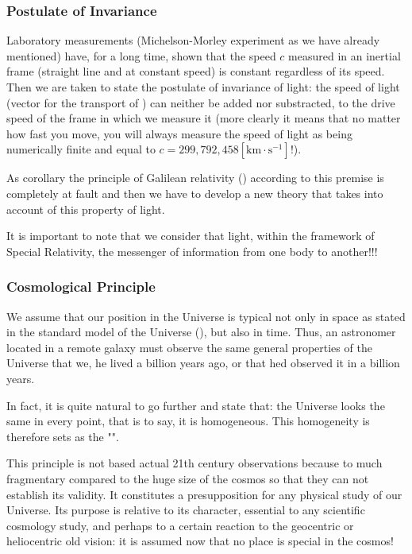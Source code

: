 	\subsubsection{Postulate of Invariance}
	Laboratory measurements (Michelson-Morley experiment as we have already mentioned) have, for a long time, shown that the speed $c$ measured in an inertial frame (straight line and at constant speed) is constant regardless of its speed. Then we are taken to state the postulate of invariance of light: the speed of light (vector for the transport of ) can neither be added nor substracted, to the drive speed of the frame in which we measure it (more clearly it means that no matter how fast you move, you will always measure the speed of light as being numerically finite and equal to $c=299,792,458 [\text{km}\cdot  \text{s}^{-1}]$!).
	
	As corollary the principle of Galilean relativity () according to this premise is completely at fault and then we have to develop a new theory that takes into account of this property of light.
	
	\begin{tcolorbox}[title=Remark,colframe=black,arc=10pt]
	It is important to note that we consider that light, within the framework of Special Relativity, the messenger of information from one body to another!!!
	\end{tcolorbox}
	
	\subsubsection{Cosmological Principle}
	We assume that our position in the Universe is typical not only in space as stated in the standard model of the Universe (), but also in time. Thus, an astronomer located in a remote galaxy must observe the same general properties of the Universe that we, he lived a billion years ago, or that hed observed it in a billion years.
	
	In fact, it is quite natural to go further and state that: the Universe looks the same in every point, that is to say, it is homogeneous. This homogeneity is therefore sets as the "".
	
	This principle is not based actual 21th century observations because to much fragmentary compared to the huge size of the cosmos so that they can not establish its validity. It constitutes a presupposition for any physical study of our Universe. Its purpose is relative to its character, essential to any scientific cosmology study, and perhaps to a certain reaction to the geocentric or heliocentric old vision: it is assumed now that no place is special in the cosmos!
	
